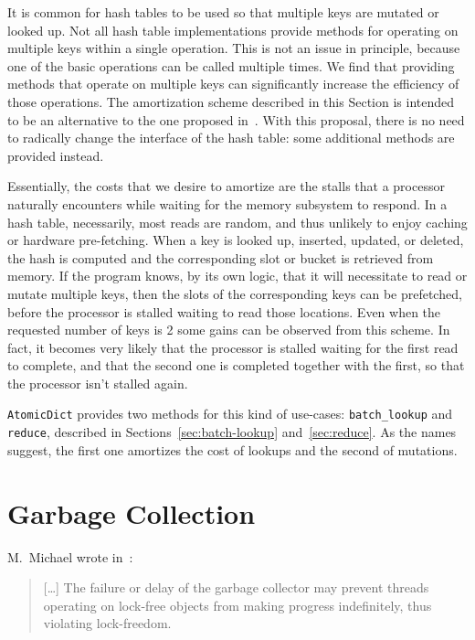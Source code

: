 It is common for hash tables to be used so that multiple keys are mutated or looked up.
Not all hash table implementations provide methods for operating on multiple keys within a single operation.
This is not an issue in principle, because one of the basic operations can be called multiple times.
We find that providing methods that operate on multiple keys can significantly increase the efficiency of those operations.
The amortization scheme described in this Section is intended to be an alternative to the one proposed in~\cite{dramhit}.
With this proposal, there is no need to radically change the interface of the hash table: some additional methods are provided instead.

Essentially, the costs that we desire to amortize are the stalls that a processor naturally encounters while waiting for the memory subsystem to respond.
In a hash table, necessarily, most reads are random, and thus unlikely to enjoy caching or hardware pre-fetching.
When a key is looked up, inserted, updated, or deleted, the hash is computed and the corresponding slot or bucket is retrieved from memory.
If the program knows, by its own logic, that it will necessitate to read or mutate multiple keys, then the slots of the corresponding keys can be prefetched, before the processor is stalled waiting to read those locations.
Even when the requested number of keys is 2 some gains can be observed from this scheme.
In fact, it becomes very likely that the processor is stalled waiting for the first read to complete, and that the second one is completed together with the first, so that the processor isn't stalled again.

\texttt{AtomicDict} provides two methods for this kind of use-cases: \texttt{{batch\_lookup}} and \texttt{reduce}, described in Sections~\ref{sec:batch-lookup} and~\ref{sec:reduce}.
As the names suggest, the first one amortizes the cost of lookups and the second of mutations.


\section{Garbage Collection}\label{sec:garbage-collection}

M.\ Michael wrote in~\cite[\S2.3]{michael-hash-tables}:
\begin{quote}
[\ldots]
    The failure or delay of the garbage collector may prevent threads operating on lock-free objects from making progress indefinitely, thus violating lock-freedom.
\end{quote}

